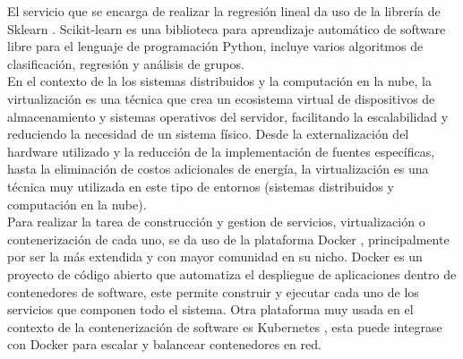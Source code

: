 \documentclass[11pt]{article}
\begin{document}
		El servicio que se encarga de realizar la regresión lineal da uso de la librería de Sklearn \cite{scikit}. Scikit-learn es una biblioteca para aprendizaje automático de software libre para el 
		lenguaje de programación Python, incluye varios algoritmos de clasificación, regresión y análisis de grupos. \\

		En el contexto de la los sistemas distribuidos y la computación en la nube, la virtualización es una técnica que crea un ecosistema virtual de dispositivos de almacenamiento 
		y sistemas operativos del servidor, facilitando la escalabilidad y reduciendo la necesidad de un sistema físico. Desde la externalización del hardware utilizado y la reducción 
		de la implementación de fuentes específicas, hasta la eliminación de costos adicionales de energía, la virtualización es una técnica muy utilizada en este tipo de entornos (sistemas
		distribuidos y computación en la nube). \\

		Para realizar la tarea de construcción y gestion de servicios, virtualización o contenerización de cada uno, se da uso de la plataforma Docker \cite{docker}, principalmente por ser la más extendida
		y con mayor comunidad en su nicho. Docker es un proyecto de código abierto que automatiza el despliegue de aplicaciones dentro de contenedores de software, este permite construir y ejecutar
		cada uno de los servicios que componen todo el sistema. Otra plataforma muy usada en el contexto de la contenerización de software es Kubernetes \cite{kubernetes_2020}, esta puede integrase con Docker para escalar y
		balancear contenedores en red. \\
\end{document}
